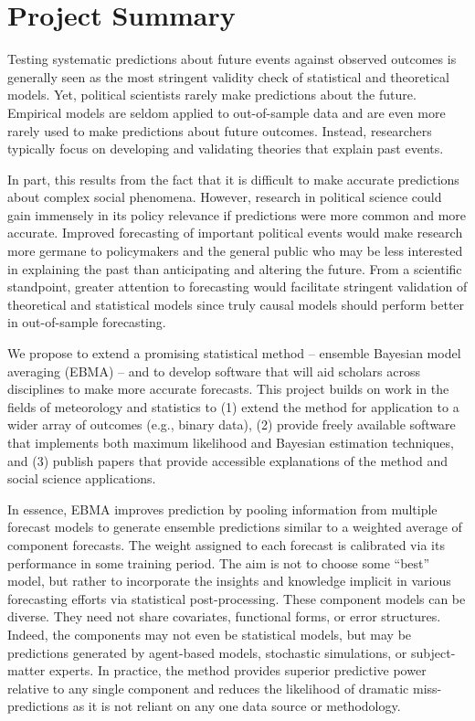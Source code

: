 \documentclass[pdftex,12pt,fullpage,oneside]{amsart}
\begin{document}
\section*{Project Summary}

\thispagestyle{empty}

Testing systematic predictions about future events against observed
outcomes is generally seen as the most stringent validity check of
statistical and theoretical models. Yet, political scientists rarely
make predictions about the future.  Empirical models are seldom
applied to out-of-sample data and are even more rarely used to make
predictions about future outcomes. Instead, researchers typically
focus on developing and validating theories that explain past events.

In part, this results from the fact that it is difficult to make
accurate predictions about complex social phenomena. However, research
in political science could gain immensely in its policy relevance if
predictions were more common and more accurate.  Improved forecasting
of important political events would make research more germane to
policymakers and the general public who may be less interested in
explaining the past than anticipating and altering the future.  From a
scientific standpoint, greater attention to forecasting would
facilitate stringent validation of theoretical and statistical models
since truly causal models should perform better in out-of-sample
forecasting.

We propose to extend a promising statistical method -- ensemble
Bayesian model averaging (EBMA) -- and to develop software that will
aid scholars across disciplines to make more accurate forecasts.
This project builds on work in the fields of meteorology and
statistics to (1) extend the method for application to a wider array
of outcomes (e.g., binary data), (2) provide freely available software
that implements both maximum likelihood and Bayesian estimation
techniques, and (3) publish papers that provide accessible
explanations of the method and social science applications.

In essence, EBMA improves prediction by pooling information from
multiple forecast models to generate ensemble predictions similar to a
weighted average of component forecasts. The weight assigned to each
forecast is calibrated via its performance in some training
period. The aim is not to choose some ``best'' model, but rather to
incorporate the insights and knowledge implicit in various forecasting
efforts via statistical post-processing.  These component models can be
diverse.  They need not share covariates, functional forms, or error
structures. Indeed, the components may not even be statistical models,
but may be predictions generated by agent-based models, stochastic
simulations, or subject-matter experts.  In practice, the method provides
superior predictive power relative to any single component and reduces
the likelihood of dramatic miss-predictions as it is not reliant on any
one data source or methodology.
\end{document}

